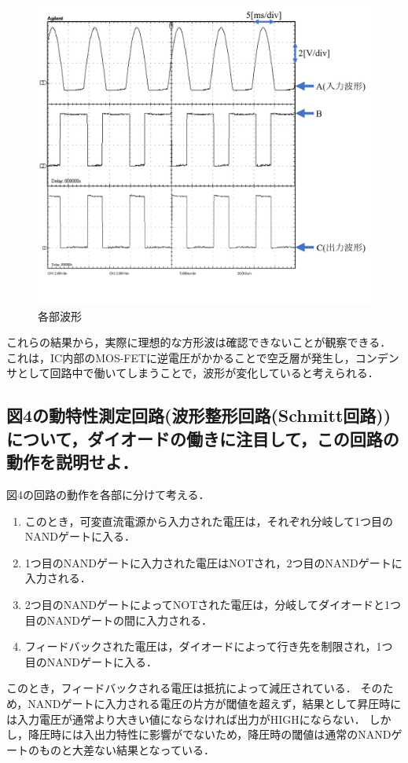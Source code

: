 \documentclass[10pt, a4j, dvipdfmx]{jarticle}
\begin{document}
\begin{figure}[H]
	\centering
	\includegraphics[width=0.8\hsize]{images/Experiment/7_1_graph.png}
	\caption{各部波形}
	\label{fig:7.1.graph}
\end{figure}
これらの結果から，実際に理想的な方形波は確認できないことが観察できる．
これは，IC内部のMOS-FETに逆電圧がかかることで空乏層が発生し，コンデンサとして回路中で働いてしまうことで，波形が変化していると考えられる．

\subsection{図4の動特性測定回路(波形整形回路(Schmitt回路))について，ダイオードの働きに注目して，この回路の動作を説明せよ．}
図4の回路の動作を各部に分けて考える．
\begin{enumerate}
	\item このとき，可変直流電源から入力された電圧は，それぞれ分岐して1つ目のNANDゲートに入る．
	\item 1つ目のNANDゲートに入力された電圧はNOTされ，2つ目のNANDゲートに入力される．
	\item 2つ目のNANDゲートによってNOTされた電圧は，分岐してダイオードと1つ目のNANDゲートの間に入力される．
	\item フィードバックされた電圧は，ダイオードによって行き先を制限され，1つ目のNANDゲートに入る．
\end{enumerate}
このとき，フィードバックされる電圧は抵抗によって減圧されている．
そのため，NANDゲートに入力される電圧の片方が閾値を超えず，結果として昇圧時には入力電圧が通常より大きい値にならなければ出力がHIGHにならない．
しかし，降圧時には入出力特性に影響がでないため，降圧時の閾値は通常のNANDゲートのものと大差ない結果となっている．
\end{document}
